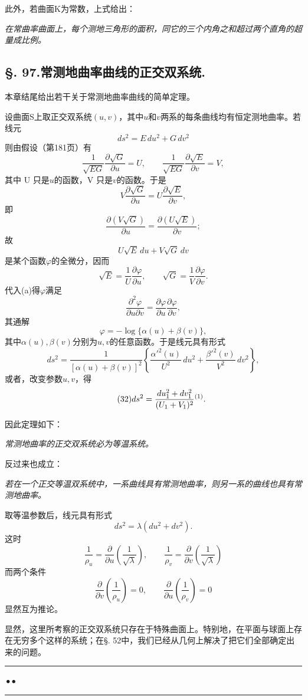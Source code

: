此外，若曲面K为常数，上式给出：

\emph{在常曲率曲面上，每个测地三角形的面积，同它的三个内角之和超过两个直角的超量成比例。}

\subsection*{\S. 97.\quad 常测地曲率曲线的正交双系统.}

本章结尾给出若干关于常测地曲率曲线的简单定理。

设曲面S上取正交双系统\((u,v)\)，其中\(u\)和\(v\)两系的每条曲线均有恒定测地曲率。若线元
\[
 ds^2=E\,du^2+G\,dv^2
\]
则由假设（第181页）有
\begin{equation}\tag{a}
 \frac1{\sqrt{EG}}\frac{\partial\sqrt G}{\partial u}=U,
  \qquad
 \frac1{\sqrt{EG}}\frac{\partial\sqrt E}{\partial v}=V,
\end{equation}
其中 U 只是\(u\)的函数，V 只是\(v\)的函数。于是
\[
 V\frac{\partial\sqrt G}{\partial u}=U\frac{\partial\sqrt E}{\partial v},
\]
即
\[
 \frac{\partial(V\sqrt G)}{\partial u}=\frac{\partial(U\sqrt E)}{\partial v};
\]
故
\[
 U\sqrt E\,du+V\sqrt G\,dv
\]
是某个函数\(\varphi\)的全微分，因而
\[
 \sqrt E=\frac1U\frac{\partial\varphi}{\partial u},
  \qquad
 \sqrt G=\frac1V\frac{\partial\varphi}{\partial v}.
\]
代入(a)得\(\varphi\)满足
\[
 \frac{\partial^2\varphi}{\partial u\partial v}=\frac{\partial\varphi}{\partial u}\frac{\partial\varphi}{\partial v},
\]
其通解
\[
 \varphi=-\log\{\alpha(u)+\beta(v)\},
\]
其中\(\alpha(u),\beta(v)\)分别为\(u,v\)的任意函数。于是线元具有形式
\[
 ds^2=\frac1{[\alpha(u)+\beta(v)]^2}\left\{\frac{\alpha'^2(u)}{U^2}\,du^2+\frac{\beta'^2(v)}{V^2}\,dv^2\right\},
\]
或者，改变参数\(u,v\)，得
\begin{equation}\tag{32}
 ds^2=\frac{du_1^2+dv_1^2}{(U_1+V_1)^2}\srcfnmark{1}.
\end{equation}

因此定理如下：

\emph{常测地曲率的正交双系统必为等温系统。}

反过来也成立：

\emph{若在一个正交等温双系统中，一系曲线具有常测地曲率，则另一系的曲线也具有常测地曲率。}

取等温参数后，线元具有形式
\[
 ds^2=\lambda(du^2+dv^2).
\]
这时
\[
 \frac1{\rho_u}=\frac{\partial}{\partial u}\left(\frac1{\sqrt\lambda}\right),
 \qquad
 \frac1{\rho_v}=\frac{\partial}{\partial v}\left(\frac1{\sqrt\lambda}\right)
\]
而两个条件
\[
 \frac{\partial}{\partial v}\left(\frac1{\rho_u}\right)=0,
 \qquad
 \frac{\partial}{\partial u}\left(\frac1{\rho_v}\right)=0
\]
显然互为推论。

显然，这里所考察的正交双系统只存在于特殊曲面上。特别地，在平面与球面上存在无穷多个这样的系统；在\S. 52中，我们已经从几何上解决了把它们全部确定出来的问题。

\begin{center}\rule{2.5em}{0.4pt}\,\(\bullet\bullet\)\,\rule{2.5em}{0.4pt}\end{center}
